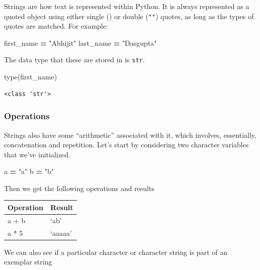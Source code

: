 \documentclass[
  letterpaper,
]{scrbook}
\newenvironment{Shaded}{\begin{snugshade}}{\end{snugshade}}
\newcommand{\BuiltInTok}[1]{#1}
\newcommand{\NormalTok}[1]{#1}
\newcommand{\OperatorTok}[1]{\textcolor[rgb]{0.81,0.36,0.00}{\textbf{#1}}}
\newcommand{\StringTok}[1]{\textcolor[rgb]{0.31,0.60,0.02}{#1}}
\begin{document}
Strings are how text is represented within Python. It is always represented as a quoted object using either single (\texttt{\textquotesingle{}\textquotesingle{}}) or double (\texttt{""}) quotes, as long as the types of quotes are matched. For example:

\begin{Shaded}
\begin{Highlighting}[]
\NormalTok{first_name }\OperatorTok{=} \StringTok{"Abhijit"}
\NormalTok{last_name }\OperatorTok{=} \StringTok{"Dasgupta"}
\end{Highlighting}
\end{Shaded}

The data type that these are stored in is \texttt{str}.

\begin{Shaded}
\begin{Highlighting}[]
\BuiltInTok{type}\NormalTok{(first_name)}
\end{Highlighting}
\end{Shaded}

\begin{verbatim}
<class 'str'>
\end{verbatim}

\hypertarget{operations}{%
\subsubsection{Operations}\label{operations}}

Strings also have some ``arithmetic'' associated with it, which involves, essentially, concatenation and repetition. Let's start by considering two character variables that we've initialized.

\begin{Shaded}
\begin{Highlighting}[]
\NormalTok{a }\OperatorTok{=} \StringTok{"a"}
\NormalTok{b }\OperatorTok{=} \StringTok{"b"}
\end{Highlighting}
\end{Shaded}

Then we get the following operations and results

\begin{longtable}[]{@{}ll@{}}
\toprule
Operation & Result\tabularnewline
\midrule
\endhead
a + b & `ab'\tabularnewline
a * 5 & `aaaaa'\tabularnewline
\bottomrule
\end{longtable}

We can also see if a particular character or character string is part of an exemplar string
\end{document}
